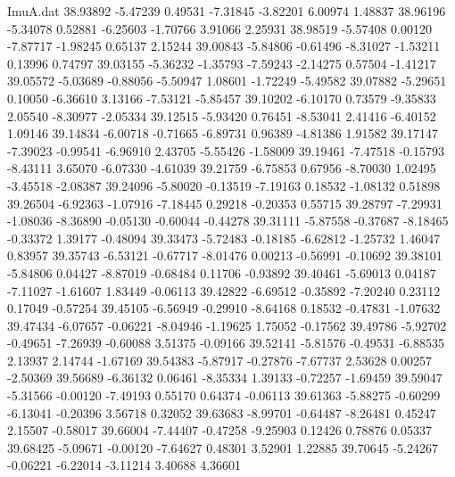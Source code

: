\begin{filecontents}{ImuA.dat}
  38.93892   -5.47239    0.49531   -7.31845   -3.82201    6.00974    1.48837
  38.96196   -5.34078    0.52881   -6.25603   -1.70766    3.91066    2.25931
  38.98519   -5.57408    0.00120   -7.87717   -1.98245    0.65137    2.15244
  39.00843   -5.84806   -0.61496   -8.31027   -1.53211    0.13996    0.74797
  39.03155   -5.36232   -1.35793   -7.59243   -2.14275    0.57504   -1.41217
  39.05572   -5.03689   -0.88056   -5.50947    1.08601   -1.72249   -5.49582
  39.07882   -5.29651    0.10050   -6.36610    3.13166   -7.53121   -5.85457
  39.10202   -6.10170    0.73579   -9.35833    2.05540   -8.30977   -2.05334
  39.12515   -5.93420    0.76451   -8.53041    2.41416   -6.40152    1.09146
  39.14834   -6.00718   -0.71665   -6.89731    0.96389   -4.81386    1.91582
  39.17147   -7.39023   -0.99541   -6.96910    2.43705   -5.55426   -1.58009
  39.19461   -7.47518   -0.15793   -8.43111    3.65070   -6.07330   -4.61039
  39.21759   -6.75853    0.67956   -8.70030    1.02495   -3.45518   -2.08387
  39.24096   -5.80020   -0.13519   -7.19163    0.18532   -1.08132    0.51898
  39.26504   -6.92363   -1.07916   -7.18445    0.29218   -0.20353    0.55715
  39.28797   -7.29931   -1.08036   -8.36890   -0.05130   -0.60044   -0.44278
  39.31111   -5.87558   -0.37687   -8.18465   -0.33372    1.39177   -0.48094
  39.33473   -5.72483   -0.18185   -6.62812   -1.25732    1.46047    0.83957
  39.35743   -6.53121   -0.67717   -8.01476    0.00213   -0.56991   -0.10692
  39.38101   -5.84806    0.04427   -8.87019   -0.68484    0.11706   -0.93892
  39.40461   -5.69013    0.04187   -7.11027   -1.61607    1.83449   -0.06113
  39.42822   -6.69512   -0.35892   -7.20240    0.23112    0.17049   -0.57254
  39.45105   -6.56949   -0.29910   -8.64168    0.18532   -0.47831   -1.07632
  39.47434   -6.07657   -0.06221   -8.04946   -1.19625    1.75052   -0.17562
  39.49786   -5.92702   -0.49651   -7.26939   -0.60088    3.51375   -0.09166
  39.52141   -5.81576   -0.49531   -6.88535    2.13937    2.14744   -1.67169
  39.54383   -5.87917   -0.27876   -7.67737    2.53628    0.00257   -2.50369
  39.56689   -6.36132    0.06461   -8.35334    1.39133   -0.72257   -1.69459
  39.59047   -5.31566   -0.00120   -7.49193    0.55170    0.64374   -0.06113
  39.61363   -5.88275   -0.60299   -6.13041   -0.20396    3.56718    0.32052
  39.63683   -8.99701   -0.64487   -8.26481    0.45247    2.15507   -0.58017
  39.66004   -7.44407   -0.47258   -9.25903    0.12426    0.78876    0.05337
  39.68425   -5.09671   -0.00120   -7.64627    0.48301    3.52901    1.22885
  39.70645   -5.24267   -0.06221   -6.22014   -3.11214    3.40688    4.36601

\end{filecontents}
